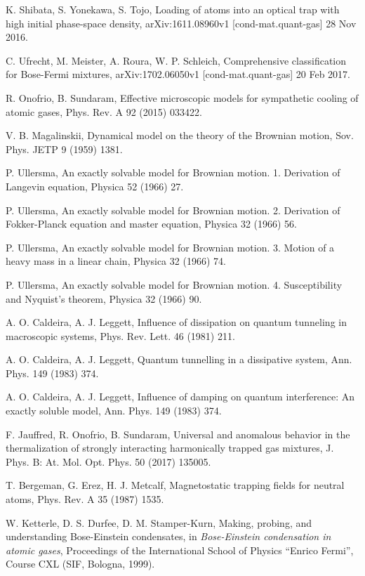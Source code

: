 \documentclass[pra,letterpaper,onecolumn,superscriptaddress,floatfix]{revtex4}
\begin{document}
\begin{thebibliography}{99}
 K. Shibata, S. Yonekawa, S. Tojo,
Loading of atoms into an optical trap with high initial phase-space density,
arXiv:1611.08960v1 [cond-mat.quant-gas] 28 Nov 2016.

 C. Ufrecht, M. Meister, A. Roura, W. P. Schleich, 
Comprehensive classification for Bose-Fermi mixtures,
arXiv:1702.06050v1 [cond-mat.quant-gas] 20 Feb 2017.

 R. Onofrio, B. Sundaram, 
Effective microscopic models for sympathetic cooling of atomic gases,
Phys. Rev. A 92 (2015) 033422.

 V. B. Magalinskii, 
Dynamical model on the theory of the Brownian motion, 
Sov. Phys. JETP 9 (1959) 1381.

 P. Ullersma, 
An exactly solvable model for Brownian motion. 
1. Derivation of Langevin equation,
Physica 52 (1966) 27.

 P. Ullersma, 
An exactly solvable model for Brownian motion. 
2. Derivation of Fokker-Planck equation and master equation,
Physica 32 (1966) 56. 

 P. Ullersma,
An exactly solvable model for Brownian motion.
3. Motion of a heavy mass in a linear chain,
Physica 32 (1966) 74.

 P. Ullersma, 
An exactly solvable model for Brownian motion.
4. Susceptibility and Nyquist's theorem,
Physica 32 (1966) 90.

 A. O. Caldeira, A. J. Leggett, 
Influence of dissipation on quantum tunneling in macroscopic systems,
Phys. Rev. Lett. 46 (1981) 211.

 A. O. Caldeira, A. J. Leggett, 
Quantum tunnelling in a dissipative system,
Ann. Phys. 149 (1983) 374.

 A. O. Caldeira, A. J. Leggett, 
Influence of damping on quantum interference: An exactly soluble model,
Ann. Phys. 149 (1983) 374.

 F. Jauffred, R. Onofrio, B. Sundaram, 
Universal and anomalous behavior in the thermalization of strongly interacting harmonically trapped gas mixtures, 
J. Phys. B: At. Mol. Opt. Phys. 50 (2017) 135005.

 T. Bergeman, G. Erez, H. J. Metcalf, 
Magnetostatic trapping fields for neutral atoms,
Phys. Rev. A 35 (1987) 1535.

 W. Ketterle, D. S. Durfee, D. M. Stamper-Kurn, Making, probing, and understanding 
Bose-Einstein condensates, in {\sl Bose-Einstein condensation in atomic gases}, Proceedings of 
the International School of Physics ``Enrico Fermi'', Course CXL (SIF, Bologna, 1999).


\end{thebibliography}
\end{document}
